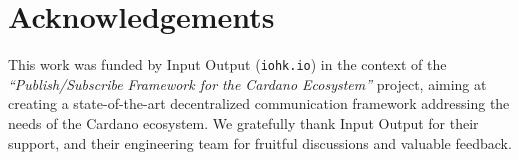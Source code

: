 \section*{Acknowledgements}
\label{sec:acknowledgements}

This work was funded by Input Output (\texttt{iohk.io}) in the context of the \emph{``Publish/Subscribe Framework
for the Cardano Ecosystem''} project, aiming at creating a state-of-the-art decentralized communication framework addressing the needs of the Cardano ecosystem.
We gratefully thank Input Output for their support, and their engineering team for fruitful discussions and valuable feedback.
